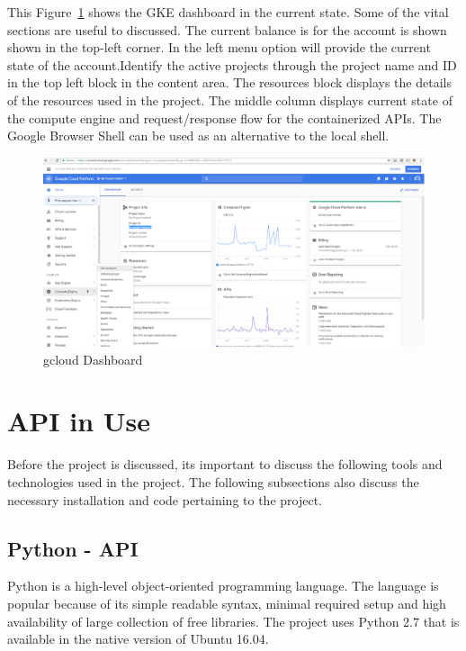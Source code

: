 This Figure~\ref{fig:gcloud-dashboard} shows the GKE dashboard in the current
state. Some of the vital sections are useful to discussed. The current balance
is for the account is shown shown in the top-left corner. In the left menu
option will provide the current state of the account.Identify the active
projects through the project name and ID in the top left block in the content
area. The resources block displays the details of the resources used in the
project. The middle column displays current state of the compute engine and
request/response flow for the containerized APIs. The Google Browser Shell can
be used as an alternative to the local shell.



\begin{figure}[htb]
 \centering\includegraphics[width=\columnwidth]{images/hid_417_gcloud_browser.png}
 \caption{gcloud Dashboard}\label{fig:gcloud-dashboard}
\end{figure}

 
\section{API in Use}

Before the project is discussed, its important to discuss the following tools
and technologies used in the project. The following subsections also discuss
the necessary installation and code pertaining to the project.


\subsection{Python - API}
Python is a high-level object-oriented programming language. The language is
popular because of its simple readable syntax, minimal required setup and high
availability of large collection of free libraries. The project uses Python
2.7 that is available in the native version of Ubuntu 16.04.

